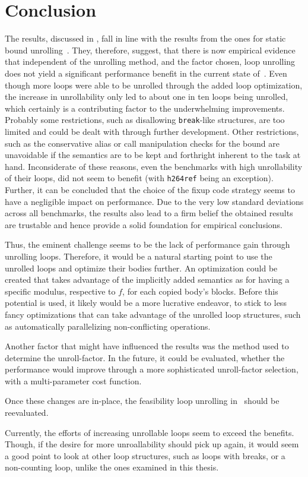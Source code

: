 \chapter{Conclusion}\label{sec:conclusion}

The results, discussed in , fall in line with the results from the ones for static bound unrolling~\cite{aebi18bachelorarbeit}.
They, therefore, suggest, that there is now empirical evidence that independent of the unrolling method, and the factor chosen, loop unrolling does not yield a significant performance benefit in the current state of~\libFIRM.
Even though more loops were able to be unrolled through the added loop optimization, the increase in unrollability only led to about one in ten loops being unrolled, which certainly is a contributing factor to the underwhelming improvements.
Probably some restrictions, such as disallowing \texttt{break}-like structures, are too limited and could be dealt with through further development.
Other restrictions, such as the conservative alias or call manipulation checks for the bound are unavoidable if the semantics are to be kept and forthright inherent to the task at hand.
Inconsiderate of these reasons, even the benchmarks with high unrollability of their loops, did not seem to benefit (with \texttt{h264ref} being an exception).
Further, it can be concluded that the choice of the fixup code strategy seems to have a negligible impact on performance.
Due to the very low standard deviations across all benchmarks, the results also lead to a firm belief the obtained results are trustable and hence provide a solid foundation for empirical conclusions.

Thus, the eminent challenge seems to be the lack of performance gain through unrolling loops.
Therefore, it would be a natural starting point to use the unrolled loops and optimize their bodies further.
An optimization could be created that takes advantage of the implicitly added semantics as for having a specific modulus, respective to $f$, for each copied body's blocks.
Before this potential is used, it likely would be a more lucrative endeavor, to stick to less fancy optimizations that can take advantage of the unrolled loop structures, such as automatically parallelizing non-conflicting operations.

Another factor that might have influenced the results was the method used to determine the unroll-factor.
In the future, it could be evaluated, whether the performance would improve through a more sophisticated unroll-factor selection, with a multi-parameter cost function.

Once these changes are in-place, the feasibility loop unrolling in~\libFIRM{} should be reevaluated.

Currently, the efforts of increasing unrollable loops seem to exceed the benefits.
Though, if the desire for more unroallability should pick up again, it would seem a good point to look at other loop structures, such as loops with breaks, or a non-counting loop, unlike the ones examined in this thesis.
